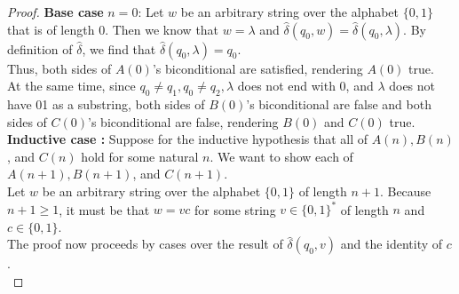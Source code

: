 \documentclass[10pt]{article}
\begin{document}
\begin{enumerate}[label={}]
\begin{proof}
                  \textbf{Base case} $n=0$: Let $w$ be an arbitrary string over the alphabet $\{0,1\}$ that is of length 0. Then we know that $w=\lambda$ and $\hat{\delta}\left(q_0, w\right)=\hat{\delta}\left(q_0, \lambda\right)$. By definition of $\hat{\delta}$, we find that $\hat{\delta}\left(q_0, \lambda\right)=q_0$.\\
                  Thus, both sides of $A(0)$'s biconditional are satisfied, rendering $A(0)$ true.\\
                  At the same time, since $q_0 \neq q_1, q_0 \neq q_2, \lambda$ does not end with 0, and $\lambda$ does not have 01 as a substring, both sides of $B(0)$'s biconditional are false and both sides of $C(0)$'s biconditional are false, rendering $B(0)$ and $C(0)$ true.\\

                  \textbf{Inductive case :} Suppose for the inductive hypothesis that all of $A(n), B(n)$, and $C(n)$ hold for some natural $n$. We want to show each of $A(n+1), B(n+1)$, and $C(n+1)$.\\
                  Let $w$ be an arbitrary string over the alphabet $\{0,1\}$ of length $n+1$. Because $n+1 \geq 1$, it must be that $w=v c$ for some string $v \in\{0,1\}^*$ of length $n$ and $c \in\{0,1\}$.\\
                  The proof now proceeds by cases over the result of $\hat{\delta}\left(q_0, v\right)$ and the identity of $c$.\\


\end{proof}
\end{enumerate}
\end{document}

